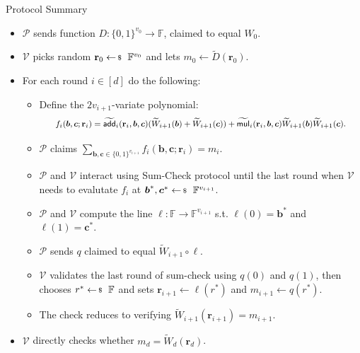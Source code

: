 \documentclass{zkdl-presentation-template}
\begin{document}
    \begin{frame}{Protocol Summary}
        \begin{proposition}
        \small
        \begin{itemize}
            \item $\mathcal{P}$ sends function $D: \{0,1\}^{v_0} \to
            \mathbb{F}$, claimed to equal $W_0$.\pause
            \item $\mathcal{V}$ picks random $\mathbf{r}_0 \leftarrowS
            \mathbb{F}^{v_0}$ and lets $m_0 \gets \widetilde{D}(\mathbf{r}_0)$.\pause
            \item For each round $i \in [d]$ do the following:
            \begin{itemize}
                \item Define the $2v_{i+1}$-variate polynomial:
                \vspace{-5px}
                \begin{equation*}
                    \footnotesize f_i(\boldsymbol{b}, \boldsymbol{c}; \mathbf{r}_i) = \widetilde{\mathsf{add}}_i(\mathbf{r}_i, \boldsymbol{b}, \boldsymbol{c})(\widetilde{W}_{i+1}(\boldsymbol{b}) + \widetilde{W}_{i+1}(\boldsymbol{c})) + \widetilde{\mathsf{mul}}_i(\mathbf{r}_i, \boldsymbol{b}, \boldsymbol{c})\widetilde{W}_{i+1}(\boldsymbol{b})\widetilde{W}_{i+1}(\boldsymbol{c}).
                \end{equation*}
                \item $\mathcal{P}$ claims $\sum_{\boldsymbol{b},\boldsymbol{c}
                \in \{0,1\}^{v_{i+1}}} f_i(\boldsymbol{b},\boldsymbol{c};
                \mathbf{r}_i) = m_i$.\pause
                \item $\mathcal{P}$ and $\mathcal{V}$ interact using Sum-Check
                protocol until the last round when $\mathcal{V}$ needs to
                evalutate $f_i$ at $\boldsymbol{b}^*, \boldsymbol{c}^*
                \leftarrowS \mathbb{F}^{v_{i+1}}$.\pause
                \item $\mathcal{P}$ and $\mathcal{V}$ compute the line $\ell:
                \mathbb{F} \to \mathbb{F}^{v_{i+1}}$ s.t.
                $\ell(0)=\boldsymbol{b}^*$ and $\ell(1)=\boldsymbol{c}^*$.
                \item $\mathcal{P}$ sends $q$ claimed to equal
                $\widetilde{W}_{i+1} \circ \ell$.\pause
                \item $\mathcal{V}$ validates the last round of sum-check using
                $q(0)$ and $q(1)$, then chooses $r^*
                \leftarrowS \mathbb{F}$ and sets $\mathbf{r}_{i+1}
                \gets \ell(r^*)$ and $m_{i+1} \gets
                q(r^*)$.
                \item The check reduces to verifying $\widetilde{W}_{i+1}(\mathbf{r}_{i+1})=m_{i+1}$.\pause
            \end{itemize}
            \item $\mathcal{V}$ directly checks whether
            $m_d=\widetilde{W}_d(\mathbf{r}_d)$.
        \end{itemize}
        \end{proposition}
    \end{frame}
\end{document}

